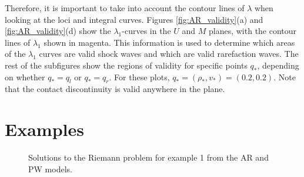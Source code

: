 \documentclass{article}
\begin{document}
Therefore, it is important to take into account the contour lines of $\lambda$ when 
looking at the loci and integral curves. Figures \ref{fig:AR_validity}(a) and 
\ref{fig:AR_validity}(d) show the $\lambda_1$-curves in the $U$ and $M$ planes,
with the contour lines of $\lambda_1$ shown in magenta. This information is used
to determine which areas of the $\lambda_1$ curves are valid shock waves and which
are valid rarefaction waves. The rest of the subfigures show the regions of validity for 
specific points $q_*$, depending on whether $q_* = q_l$ or $q_* = q_r$. For these plots,
$q_* = (\rho_*,v_*) = (0.2, 0.2)$. Note that the contact discontinuity is valid
anywhere in the plane. 

\section{Examples}

\begin{figure}[h!]
 \centering
 \caption[Optional caption for list of figures]
 {Solutions to the Riemann problem for example 1 from the AR and PW models.}
  \label{fig:example1}
\end{figure}
\end{document}
